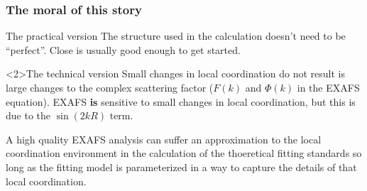 \documentclass[10pt, xcolor=x11names, compress]{beamer}
\begin{document}
\begin{frame}
  \frametitle{The moral of this story}
  \begin{block}{The practical version}
    The structure used in the {\feff} calculation doesn't need to be
    ``perfect''.  Close is usually good enough to get started.
  \end{block}

  \medskip

  \begin{alertblock}<2>{The technical version}
    Small changes in local coordination do not result is large changes
    to the complex scattering factor ($F(k)$ and $\Phi(k)$ in the
    EXAFS equation).  EXAFS \alert{\textbf{is}} sensitive to small
    changes in local coordination, but this is due to the $\sin(2kR)$
    term.

    \smallskip

    A high quality EXAFS analysis can suffer an approximation to the
    local coordination environment in the calculation of the
    thoeretical fitting standards so long as the fitting model is
    parameterized in a way to capture the details of that local
    coordination.
  \end{alertblock}
\end{frame}
\end{document}
